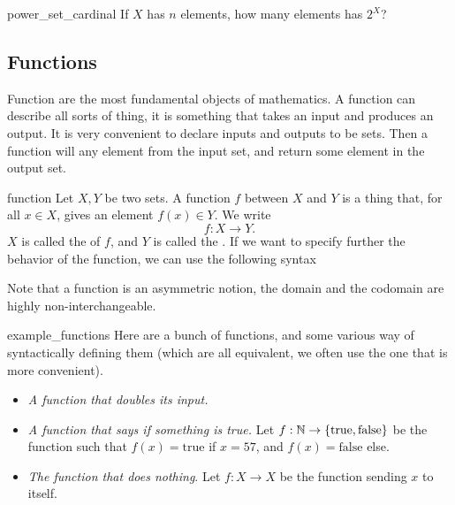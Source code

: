 \begin{cex}{}{power_set_cardinal}
    If \( X \) has \( n \) elements, how many elements has \( 2^X \)?
\end{cex}


\subsection{Functions}

Function are the most fundamental objects of mathematics. A function can describe all sorts of thing, it is something that takes an input and produces an output. It is very convenient to declare inputs and outputs to be sets. Then a function will any element from the input set, and return some element in the output set.   

\begin{cdef}{}{function}
    Let \( X, Y \) be two sets. A function \( f \) between \( X \) and \( Y \) is a thing that, for all \( x \in X \), gives an element \( f(x) \in Y \). We write
    \begin{equation*}
        f : X \to Y.
    \end{equation*}
    \( X \) is called the  of \( f \), and \( Y \) is called the . If we want to specify further the behavior of the function, we can use the following syntax
\end{cdef}

Note that a function is an asymmetric notion, the domain and the codomain are highly non-interchangeable. 
\begin{cexp}{}{example_functions}
    Here are a bunch of functions, and some various way of syntactically defining them (which are all equivalent, we often use the one that is more convenient).
    \begin{itemize}
        \item \textit{A function that doubles its input.}
        \item \textit{A function that says if something is true.} Let \( f : \mathbb{N} \to \{ \mathrm{true}, \mathrm{false} \} \) be the function such that \( f(x) = \mathrm{true} \) if \( x = 57 \), and \( f(x) = \mathrm{false} \) else. 
        \item \textit{The function that does nothing}. Let \( f : X \to X \) be the function sending \( x \) to itself.
    \end{itemize} 
\end{cexp}

